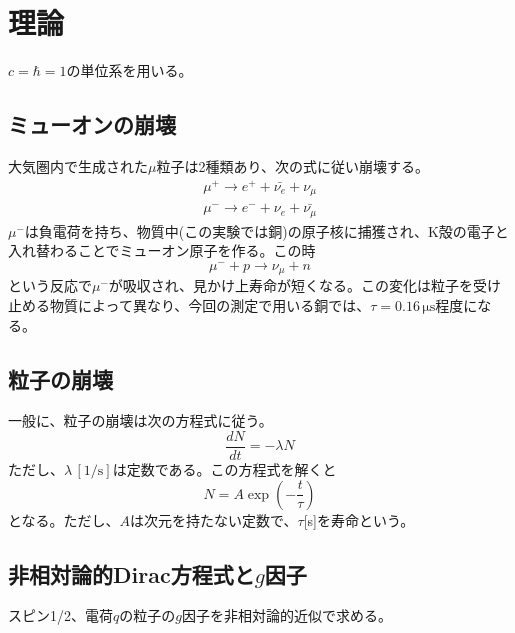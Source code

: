 \section{理論}
$c=\hbar=1$の単位系を用いる。

\subsection{ミューオンの崩壊}
大気圏内で生成された$\mu$粒子は2種類あり、次の式に従い崩壊する。
\begin{align}
\mu^+\to e^++\bar{\nu_e}+\nu_\mu \\
\mu^-\to e^-+{\nu_e}+\bar{\nu_\mu}
\end{align}
$\mu^-$は負電荷を持ち、物質中(この実験では銅)の原子核に捕獲され、K殻の電子と入れ替わることでミューオン原子を作る。この時
\begin{equation}
\mu^-+p \to\nu_\mu+n
\end{equation}
という反応で$\mu^-$が吸収され、見かけ上寿命が短くなる。この変化は粒子を受け止める物質によって異なり、今回の測定で用いる銅では、$\tau=0.16\,\mathrm{\mu s}$程度になる。

\subsection{粒子の崩壊}
一般に、粒子の崩壊は次の方程式に従う。
\begin{equation}
\frac{dN}{dt}=-\lambda N
\end{equation}
ただし、$\lambda\,[\mathrm{1/s}]$は定数である。この方程式を解くと
\begin{equation}
N = A\exp\left(-\frac{t}{\tau}\right)
\end{equation}
となる。ただし、$A$は次元を持たない定数で、$\tau$[s]を寿命という。

\subsection{非相対論的Dirac方程式と$g$因子}
スピン1/2、電荷$q$の粒子の$g$因子を非相対論的近似で求める。

